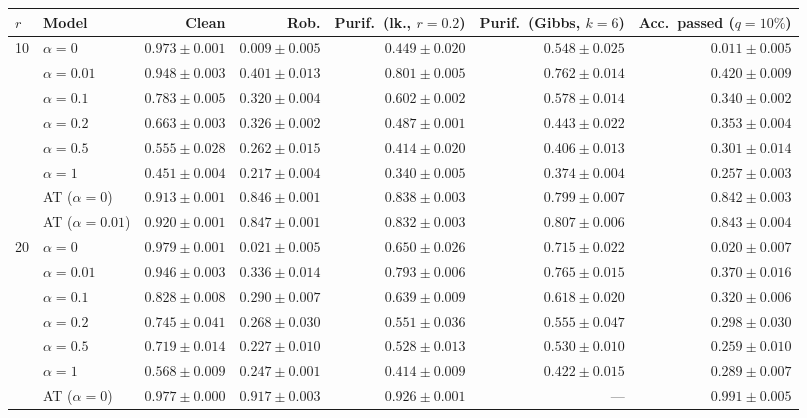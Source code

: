 \begin{tabular}{@{}llrrrrr@{}}
\toprule
$r$ & Model & Clean & Rob. & Purif.\ (lk., $r{=}0.2$) & Purif.\ (Gibbs, $k{=}6$) & Acc.\ passed ($q{=}10\%$) \\
\midrule
\multirow{8}{*}{10} & $\alpha{=}0$ & $0.973 \pm 0.001$ & $0.009 \pm 0.005$ & $0.449 \pm 0.020$ & $0.548 \pm 0.025$ & $0.011 \pm 0.005$ \\
 & $\alpha{=}0.01$ & $0.948 \pm 0.003$ & $0.401 \pm 0.013$ & $0.801 \pm 0.005$ & $0.762 \pm 0.014$ & $0.420 \pm 0.009$ \\
 & $\alpha{=}0.1$ & $0.783 \pm 0.005$ & $0.320 \pm 0.004$ & $0.602 \pm 0.002$ & $0.578 \pm 0.014$ & $0.340 \pm 0.002$ \\
 & $\alpha{=}0.2$ & $0.663 \pm 0.003$ & $0.326 \pm 0.002$ & $0.487 \pm 0.001$ & $0.443 \pm 0.022$ & $0.353 \pm 0.004$ \\
 & $\alpha{=}0.5$ & $0.555 \pm 0.028$ & $0.262 \pm 0.015$ & $0.414 \pm 0.020$ & $0.406 \pm 0.013$ & $0.301 \pm 0.014$ \\
 & $\alpha{=}1$ & $0.451 \pm 0.004$ & $0.217 \pm 0.004$ & $0.340 \pm 0.005$ & $0.374 \pm 0.004$ & $0.257 \pm 0.003$ \\
 & AT ($\alpha{=}0$) & $0.913 \pm 0.001$ & $0.846 \pm 0.001$ & $0.838 \pm 0.003$ & $0.799 \pm 0.007$ & $0.842 \pm 0.003$ \\
 & AT ($\alpha{=}0.01$) & $0.920 \pm 0.001$ & $0.847 \pm 0.001$ & $0.832 \pm 0.003$ & $0.807 \pm 0.006$ & $0.843 \pm 0.004$ \\
\cmidrule(lr){1-7}
\multirow{8}{*}{20} & $\alpha{=}0$ & $0.979 \pm 0.001$ & $0.021 \pm 0.005$ & $0.650 \pm 0.026$ & $0.715 \pm 0.022$ & $0.020 \pm 0.007$ \\
 & $\alpha{=}0.01$ & $0.946 \pm 0.003$ & $0.336 \pm 0.014$ & $0.793 \pm 0.006$ & $0.765 \pm 0.015$ & $0.370 \pm 0.016$ \\
 & $\alpha{=}0.1$ & $0.828 \pm 0.008$ & $0.290 \pm 0.007$ & $0.639 \pm 0.009$ & $0.618 \pm 0.020$ & $0.320 \pm 0.006$ \\
 & $\alpha{=}0.2$ & $0.745 \pm 0.041$ & $0.268 \pm 0.030$ & $0.551 \pm 0.036$ & $0.555 \pm 0.047$ & $0.298 \pm 0.030$ \\
 & $\alpha{=}0.5$ & $0.719 \pm 0.014$ & $0.227 \pm 0.010$ & $0.528 \pm 0.013$ & $0.530 \pm 0.010$ & $0.259 \pm 0.010$ \\
 & $\alpha{=}1$ & $0.568 \pm 0.009$ & $0.247 \pm 0.001$ & $0.414 \pm 0.009$ & $0.422 \pm 0.015$ & $0.289 \pm 0.007$ \\
 & AT ($\alpha{=}0$) & $0.977 \pm 0.000$ & $\mathbf{0.917 \pm 0.003}$ & $\mathbf{0.926 \pm 0.001}$ & --- & $\mathbf{0.991 \pm 0.005}$ \\

\end{tabular}
